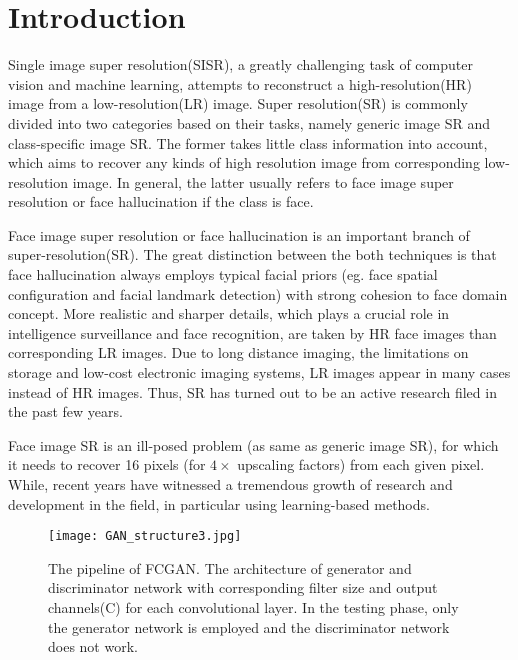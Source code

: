 \documentclass[conference,compsoc]{IEEEtran}
\begin{document}


%
\IEEEpeerreviewmaketitle


\section{Introduction}
Single image super resolution(SISR), a greatly challenging task of computer vision and machine learning, attempts to reconstruct a high-resolution(HR) image from a low-resolution(LR) image. Super resolution(SR) is commonly divided into two categories based on their tasks, namely generic image SR and class-specific image SR. The former takes little class information into account, which aims to recover any kinds of high resolution image from corresponding low-resolution image. In general, the latter usually refers to face image super resolution or face hallucination if the class is face.

Face image super resolution or face hallucination\citep{Jia2011Fast, zhu2016deep, wang2014comprehensive, li-PR2014face, autee2015review, Jiang2016Noise-TCYB, jin2015robust, su2016supervised, W2016DeepJFHR} is an important branch of super-resolution(SR). The great distinction between the both techniques is that face hallucination always employs typical facial priors (eg. face spatial configuration and facial landmark detection) with strong cohesion to face domain concept. More realistic and sharper details, which plays a crucial role in intelligence surveillance\cite{Jia2011Fast, wang2014comprehensive} and face recognition\cite{W2016DeepJFHR}, are taken by HR face images than corresponding LR images. Due to long distance imaging, the limitations on storage and low-cost electronic imaging systems, LR images appear in many cases instead of HR images. Thus, SR has turned out to be an active research filed in the past few years.

Face image SR is an ill-posed problem (as same as generic image SR), for which it needs to recover 16 pixels (for $4\times$ upscaling factors) from each given pixel. While, recent years have witnessed a tremendous growth of research and development in the field, in particular using learning-based methods.
\begin{figure}[h]
  \centering
  \texttt{[image: GAN\_structure3.jpg]}
  \caption{The pipeline of FCGAN. The architecture of generator and discriminator network with corresponding filter size and output channels(C) for each convolutional layer. In the testing phase, only the generator network is employed and the discriminator network does not work. }
  \label{Fig:architecture}
\end{figure}
\end{document}
